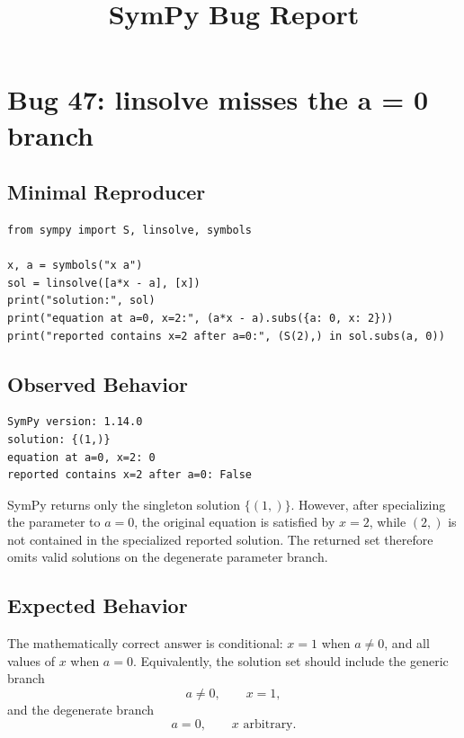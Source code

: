 \documentclass[11pt]{article}
\title{SymPy Bug Report}
\author{}
\date{}
\begin{document}
\maketitle

\section{Bug 47: linsolve misses the a = 0 branch}

\subsection{Minimal Reproducer}

\medskip

\begin{lstlisting}[style=bugpython]
from sympy import S, linsolve, symbols

x, a = symbols("x a")
sol = linsolve([a*x - a], [x])
print("solution:", sol)
print("equation at a=0, x=2:", (a*x - a).subs({a: 0, x: 2}))
print("reported contains x=2 after a=0:", (S(2),) in sol.subs(a, 0))
\end{lstlisting}

\subsection{Observed Behavior}

\medskip

\begin{lstlisting}[style=bugpython]
SymPy version: 1.14.0
solution: {(1,)}
equation at a=0, x=2: 0
reported contains x=2 after a=0: False
\end{lstlisting}

SymPy returns only the singleton solution \(\{(1,)\}\).  However, after
specializing the parameter to \(a=0\), the original equation is satisfied by
\(x=2\), while \((2,)\) is not contained in the specialized reported solution.
The returned set therefore omits valid solutions on the degenerate parameter
branch.

\subsection{Expected Behavior}

The mathematically correct answer is conditional: \(x=1\) when \(a\ne 0\), and
all values of \(x\) when \(a=0\).  Equivalently, the solution set should include
the generic branch
\[
  a \ne 0,\qquad x=1,
\]
and the degenerate branch
\[
  a=0,\qquad x \text{ arbitrary}.
\]
\end{document}
